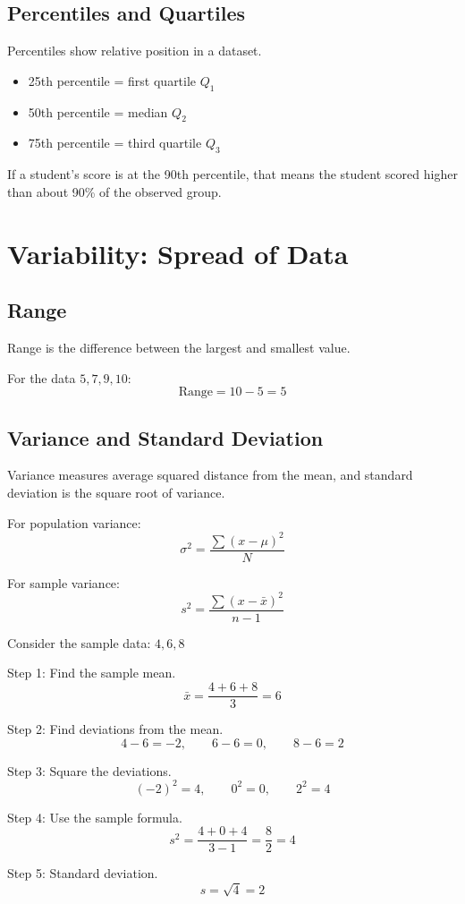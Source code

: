 \documentclass[11pt,a4paper]{article}
\begin{document}
\subsection{Percentiles and Quartiles}

Percentiles show relative position in a dataset.

\begin{itemize}[leftmargin=*]
  \item 25th percentile = first quartile $Q_1$
  \item 50th percentile = median $Q_2$
  \item 75th percentile = third quartile $Q_3$
\end{itemize}

\begin{conceptbox}[Interpretation]
If a student's score is at the 90th percentile, that means the student scored higher than about 90\% of the observed group.
\end{conceptbox}

\section{Variability: Spread of Data}

\subsection{Range}

Range is the difference between the largest and smallest value.

\begin{examplebox}
For the data $5, 7, 9, 10$:
\[
\text{Range} = 10 - 5 = 5
\]
\end{examplebox}

\subsection{Variance and Standard Deviation}

Variance measures average squared distance from the mean, and standard deviation is the square root of variance.

For population variance:
\[
\sigma^2 = \frac{\sum (x - \mu)^2}{N}
\]

For sample variance:
\[
s^2 = \frac{\sum (x - \bar{x})^2}{n-1}
\]

\begin{examplebox}
Consider the sample data: $4, 6, 8$

Step 1: Find the sample mean.
\[
\bar{x} = \frac{4+6+8}{3} = 6
\]

Step 2: Find deviations from the mean.
\[
4-6=-2, \qquad 6-6=0, \qquad 8-6=2
\]

Step 3: Square the deviations.
\[
(-2)^2=4, \qquad 0^2=0, \qquad 2^2=4
\]

Step 4: Use the sample formula.
\[
s^2 = \frac{4+0+4}{3-1} = \frac{8}{2} = 4
\]

Step 5: Standard deviation.
\[
s = \sqrt{4} = 2
\]
\end{examplebox}
\end{document}
